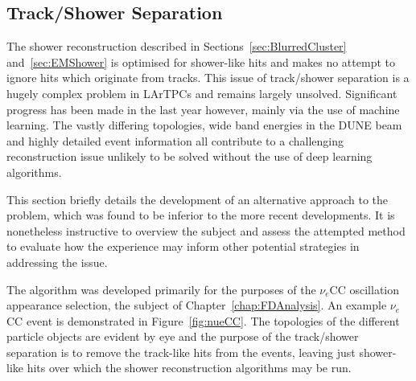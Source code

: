 \subsection{Track/Shower Separation}\label{sec:TrackShowerSeparation}

The shower reconstruction described in Sections~\ref{sec:BlurredCluster} and~\ref{sec:EMShower} is optimised for shower-like hits and makes no attempt to ignore hits which originate from tracks.  This issue of track/shower separation is a hugely complex problem in LArTPCs and remains largely unsolved.  Significant progress has been made in the last year however, mainly via the use of machine learning.  The vastly differing topologies, wide band energies in the DUNE beam and highly detailed event information all contribute to a challenging reconstruction issue unlikely to be solved without the use of deep learning algorithms.

This section briefly details the development of an alternative approach to the problem, which was found to be inferior to the more recent developments.  It is nonetheless instructive to overview the subject and assess the attempted method to evaluate how the experience may inform other potential strategies in addressing the issue.

The algorithm was developed primarily for the purposes of the $\nu_e$CC oscillation appearance selection, the subject of Chapter~\ref{chap:FDAnalysis}.  An example $\nu_e$CC event is demonstrated in Figure~\ref{fig:nueCC}.  The topologies of the different particle objects are evident by eye and the purpose of the track/shower separation is to remove the track-like hits from the events, leaving just shower-like hits over which the shower reconstruction algorithms may be run.

